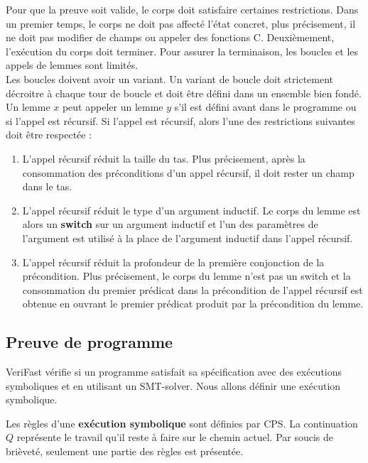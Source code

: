 \documentclass[11pt,openany]{article}
\newcommand{\verifast}{VeriFast}
\begin{document}
			Pour que la preuve soit valide, le corps doit satisfaire certaines restrictions. Dans un premier temps, le corps ne doit pas affect\'e l'\'etat concret, plus pr\'ecisement, il ne doit pas modifier de champs ou appeler des fonctions C. Deuxi\`emement, l'ex\'ecution du corps doit terminer. Pour assurer la terminaison, les boucles et les appels de lemmes sont limit\'es. \\
			Les boucles doivent avoir un variant. Un variant de boucle doit strictement d\'ecroitre  \`a chaque tour de boucle et doit \^etre d\'efini dans un ensemble bien fond\'e.\\
			Un lemme $x$ peut appeler un lemme $y$ s'il est d\'efini avant dans le programme ou si l'appel est r\'ecursif. Si l'appel est r\'ecursif, alors l'une des restrictions suivantes doit \^etre respect\'ee :
			\begin{enumerate}
			\item L'appel r\'ecursif r\'eduit la taille du tas. Plus pr\'ecisement, apr\`es la consommation des pr\'econditions d'un appel r\'ecursif, il doit rester un champ dans le tas.
			\item L'appel r\'ecursif r\'eduit le type d'un argument inductif. Le corps du lemme est alors un \textbf{switch} sur un argument inductif et l'un des param\`etres de l'argument est utilis\'e \`a la place de l'argument inductif dans l'appel r\'ecursif.
			\item L'appel r\'ecursif r\'eduit la profondeur de la premi\`ere conjonction de la pr\'econdition. Plus pr\'ecisement, le corps du lemme n'est pas un switch et la consommation du premier pr\'edicat dans la pr\'econdition de l'appel r\'ecursif est obtenue en ouvrant le premier pr\'edicat produit par la pr\'econdition du lemme.
			\end{enumerate}
				

	\subsection{Preuve de programme}
	\verifast{} v\'erifie si un programme satisfait sa sp\'ecification avec des ex\'ecutions symboliques et en utilisant un SMT-solver. Nous allons d\'efinir une ex\'ecution symbolique.
	
	Les r\`egles d'une \textbf{ex\'ecution symbolique} sont d\'efinies par CPS. La continuation $Q$ repr\'esente le travail qu'il reste \`a faire sur le chemin actuel. Par soucis de bri\`evet\'e, seulement une partie des r\`egles est pr\'esent\'ee.
	
\end{document}
